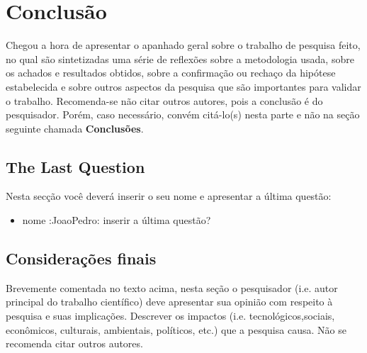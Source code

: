 \chapter{Conclusão}
\label{chap:conc}

Chegou a hora de apresentar o apanhado geral sobre o trabalho de
pesquisa feito, no qual s\~ao sintetizadas uma s\'erie de
reflex\~oes sobre a metodologia usada, sobre os achados e
resultados obtidos, sobre a confirma\c{c}\~ao ou recha\c{c}o da
hip\'otese estabelecida e sobre outros aspectos da pesquisa que
s\~ao importantes para validar o trabalho. Recomenda-se n\~ao
citar outros autores, pois a conclus\~ao \'e do pesquisador.
Por\'em, caso necess\'ario, conv\'em cit\'a-lo(s) nesta parte e
n\~ao na se\c{c}\~ao seguinte chamada \textbf{Conclus\~oes}.

\section{The Last Question}
Nesta secção você deverá inserir o seu nome e apresentar a última questão:

\begin{itemize}
    \item nome :JoaoPedro: inserir a última questão?
\end{itemize}


\section{Considerações finais}
\label{sec:consid}

Brevemente comentada no texto acima, nesta se\c{c}\~ao o
pesquisador (i.e. autor principal do trabalho cient\'ifico) deve
apresentar sua opini\~ao com respeito \`a pesquisa e suas
implica\c{c}\~oes. Descrever os impactos (i.e.
tecnol\'ogicos,sociais, econ\^omicos, culturais, ambientais,
políticos, etc.) que a pesquisa causa. N\~ao se recomenda citar
outros autores.

